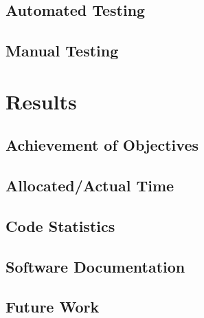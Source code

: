 \documentclass[a4paper,parskip=full]{scrreprt}
\begin{document}
\section{Automated Testing}

\section{Manual Testing}


\chapter{Results}
\label{ch:results}

\section{Achievement of Objectives}


\section{Allocated/Actual Time}
\section{Code Statistics}

\section{Software Documentation}


\section{Future Work}
\end{document}
